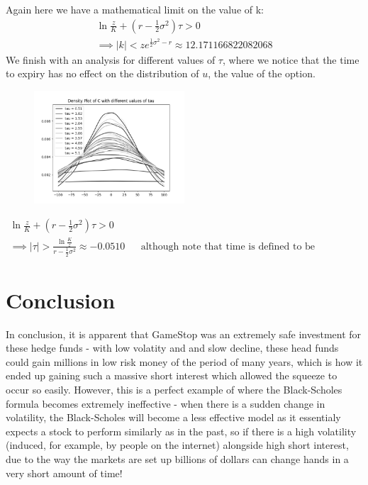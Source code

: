 \documentclass[11pt]{article} %
\begin{document}
Again here we have a mathematical limit on the value of k:
\begin{align}
    \ln{\frac{z}{K}} + (r - \frac{1}{2} \sigma^2)\tau > 0 \\
    \implies |k| < ze^{\frac{1}{2}\sigma^2 - r} \approx 12.171166822082068
\end{align}
We finish with an analysis for different values of $\tau$, where we notice that 
the time to expiry has no effect on the distribution of $u$, the value of the 
option.
\begin{figure}[h] 
    \centering
    \includegraphics[width=0.5\textwidth]{tauvalue.png} 
    \caption[]{}
    \label{tauvalue}
\end{figure}
\begin{align}
    \ln{\frac{z}{K}} + (r - \frac{1}{2} \sigma^2)\tau > 0 \\
    \implies |\tau| > \frac{\ln{\frac{K}{z}}}{r - \frac{1}{2}\sigma^2} 
    \approx -0.0510&& \text{although note that time is 
    defined to be nonegative.}
\end{align}
\section{Conclusion}
In conclusion, it is apparent that GameStop was an extremely safe investment 
for these hedge funds - with low volatity and and slow decline, these head 
funds could gain millions in low risk money of the period of many years, which 
is how it ended up gaining such a massive short interest which allowed the 
squeeze to occur so easily. However, this is a perfect example of where 
the Black-Scholes formula becomes extremely ineffective - when there is a 
sudden change in volatility, the Black-Scholes will become a less effective 
model as it essentialy expects a stock to perform similarly as in the past, 
so if there is a high volatility (induced, for example, by people on the 
internet) alongside high short interest, due to the way the markets are 
set up billions of dollars can change hands in a very short amount of time!
\end{document}
